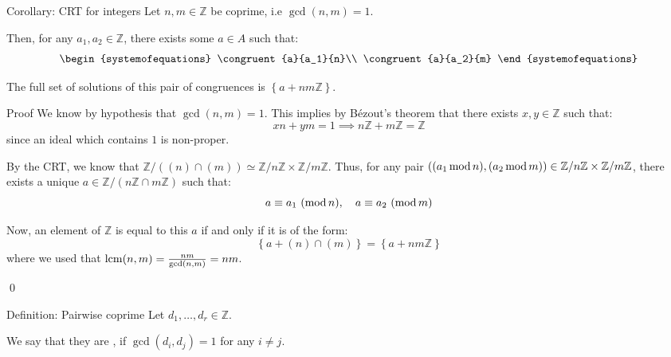 \documentclass[a4paper]{article}
\begin{document}
\begin{parag}{Corollary: CRT for integers}
    Let $n, m \in \mathbb{Z}$ be coprime, i.e $\gcd\left(n, m\right) = 1$.

    Then, for any $a_1, a_2 \in \mathbb{Z}$, there exists some $a \in A$ such that: 
    \[\begin{systemofequations} \congruent{a}{a_1}{n}\\ \congruent{a}{a_2}{m} \end{systemofequations}\]
    
    The full set of solutions of this pair of congruences is $\left\{a + nm \mathbb{Z}\right\}$.

    \begin{subparag}{Proof}
        We know by hypothesis that $\gcd\left(n, m\right) = 1$. This implies by Bézout's theorem that there exists $x, y \in \mathbb{Z}$ such that: 
        \[xn + ym = 1 \implies n\mathbb{Z} + m\mathbb{Z} = \mathbb{Z}\]
        since an ideal which contains $1$ is non-proper.

        By the CRT, we know that $\mathbb{Z} / \left(\left(n\right) \cap \left(m\right)\right) \simeq \mathbb{Z}/n\mathbb{Z} \times \mathbb{Z}/m\mathbb{Z}$. Thus, for any pair $\left(\left(a_1 \Mod n\right), \left(a_2 \Mod m\right)\right) \in \mathbb{Z}/n\mathbb{Z} \times \mathbb{Z}/m\mathbb{Z}$, there exists a unique $a \in \mathbb{Z}/\left(n\mathbb{Z} \cap m\mathbb{Z}\right)$ such that: 
        \[a \equiv a_1\ (\operatorname{mod} n), \quad a \equiv a_2\ (\operatorname{mod} m)\] 

        Now, an element of $\mathbb{Z}$ is equal to this $a$ if and only if it is of the form:
        \[\left\{a + \left(n\right) \cap \left(m\right)\right\} = \left\{a + nm\mathbb{Z}\right\}\]
        where we used that $\lcm\left(n, m\right) = \frac{nm}{\gcd\left(n, m\right)} = nm$.

        \qed
    \end{subparag}
\end{parag}

\begin{parag}{Definition: Pairwise coprime}
    Let $d_1, \ldots, d_r \in \mathbb{Z}$.

    We say that they are , if $\gcd\left(d_i, d_j\right) = 1$ for any $i \neq j$.
\end{parag}
\end{document}
